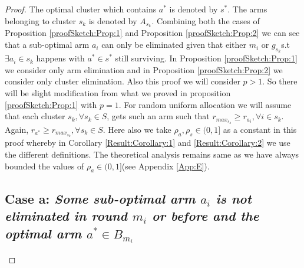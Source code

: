 \begin{proof}
The optimal cluster which contains $a^{*}$ is denoted by $s^{*}$. The arms belonging to cluster $s_{k}$ is denoted by $A_{s_{k}}$. Combining both the cases of Proposition \ref{proofSketch:Prop:1} and Proposition \ref{proofSketch:Prop:2} we can see that a sub-optimal arm $a_{i}$ can only be eliminated given that either $m_{i}$ or $g_{s_{k}}$s.t $\exists a_{i}\in s_{k}$ happens with $a^{*}\in s^{*}$ still surviving. In Proposition \ref{proofSketch:Prop:1} we consider only arm elimination and in Proposition \ref{proofSketch:Prop:2} we consider only cluster elimination. Also this proof we will consider $p>1$. So there will be slight modification from what we proved in proposition \ref{proofSketch:Prop:1} with $p=1$. For random uniform allocation we will assume that each cluster $s_{k},\forall s_{k}\in S$, gets such an arm such that $r_{{max_{s_{k}}}}\geq r_{a_{i}},\forall i\in s_{k}$. Again, $r_{a^{*}}\geq r_{{max_{s_{k}}}}, \forall s_{k}\in S$. Here also we take $\rho_{a},\rho_{s}\in (0,1]$ as a constant in this proof whereby in Corollary \ref{Result:Corollary:1} and \ref{Result:Corollary:2} we use the different definitions. The theoretical analysis remains same as we have always bounded the values of $\rho_{a}\in (0,1]$(see Appendix \ref{App:E}). 
\subsection*{Case a: \textit{Some sub-optimal arm $a_{i}$ is not eliminated in round $m_{i}$ or before and the optimal arm $a^{*}\in B_{m_{i}}$}}
 

\end{proof}
